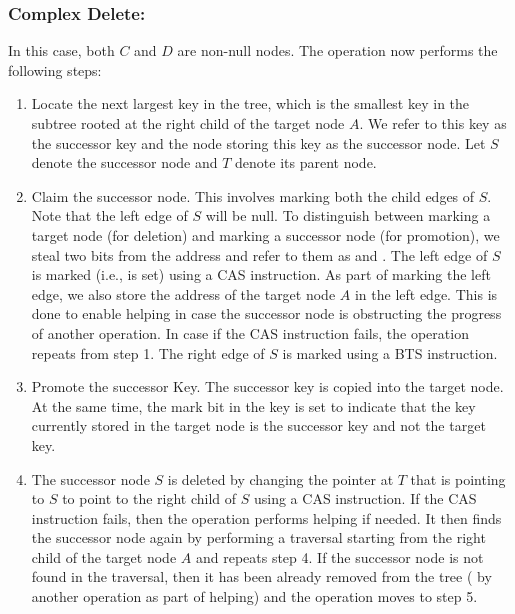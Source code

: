 \subsubsection{Complex Delete:} In this case, both $C$ and $D$ are non-null nodes. The operation now performs the following steps:
\begin{enumerate}
\item Locate the next largest key in the tree, which is the smallest key in the subtree rooted at the right child of the target node $A$. We refer to this key as the successor key and the node storing this key as the successor node. Let $S$ denote the successor node and $T$ denote its parent node.
\item Claim the successor node. This involves marking both the child edges of $S$. Note that the left edge of $S$ will be null. To distinguish between marking a target node (for deletion) and marking a successor node (for promotion), we steal two bits from the address and refer to them as \deleteFlag and \promoteFlag. The left edge of $S$ is marked (i.e., \promoteFlag is set) using a CAS instruction. As part of marking the left edge, we also store the address of the target node $A$ in the left edge. This is done to enable helping in case the successor node is obstructing the progress of another operation. In case if the CAS instruction fails, the operation repeats from step 1. The right edge of $S$ is marked using a BTS instruction.
\item Promote the successor Key. The successor key is copied into the target node. At the same time, the mark bit in the key is set to indicate that the key currently stored in the target node is the successor key and not the target key.
\item The successor node $S$ is deleted by changing the pointer at $T$ that is pointing to $S$ to point to the right child of $S$ using a CAS instruction. If the CAS instruction fails, then the operation performs helping if needed. It then finds the successor node again by performing a traversal starting from the right child of the target node $A$ and repeats step 4. If the successor node is not found in the traversal, then it has been already removed from the tree ( by another operation as part of helping) and the operation moves to step 5. 

\end{enumerate}
